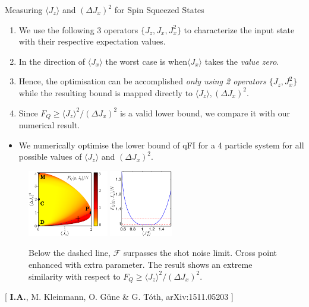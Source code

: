 \documentclass{beamer}
\newcommand{\expect}[1]{\ensuremath{\langle #1 \rangle}}
\newcommand{\varian}[1]{\ensuremath{\left(\Delta #1 \right)^2}}
\newcommand{\citate}[1]{{\footnotesize{\color{gray}[ #1 ]}}

	}
\begin{document}
		\begin{frame}
			{Measuring $\expect{J_z}$ and $\varian{J_x}$ for Spin Squeezed States}

			\begin{enumerate}
				\item<1-> We use the following 3 operators {\color{blue}$\{ J_z,J_x,J_x^2 \}$} to characterize the input state with their respective expectation values.
				\item<2-> In the direction of $\expect{J_x}$ the worst case is when$\expect{J_x}$ takes the \emph{\color{blue}value zero}.
				\item<3-> Hence, the optimisation can be accomplished \emph{\color{blue} only using 2 operators} $\{ J_z,J_x^2 \}$ while the resulting bound is mapped directly to $\expect{J_z},\varian{J_x}$.
				\item<4-> Since $F_Q\geq \expect{J_z}^2/\varian{J_x}$ is a valid lower bound, we compare it with our numerical result.
			\end{enumerate}

		\end{frame}

		\begin{frame}
			\begin{itemize}
				\item We numerically optimise the lower bound of qFI for a 4 particle system for all possible values of $\expect{J_z}$ and $\varian{J_x}$.
			\end{itemize}
			\begin{figure}
				\includegraphics[height=110px]{img/lb-spsq.pdf}
				\hspace{15px}
				\includegraphics[height=110px]{img/4thparameter-spsq.pdf}
				\caption{Below the dashed line, $\mathcal{F}$ surpasses the shot noise limit. Cross point enhanced with extra parameter. The result shows an extreme similarity with respect to $F_Q\geq \expect{J_z}^2/\varian{J_x}$.}
			\end{figure}
			\vspace{-18px}
			\citate{\textbf{I.A.}, M. Kleinmann, O. G\"une \& G. T\'oth, arXiv:1511.05203}

		\end{frame}
\end{document}
